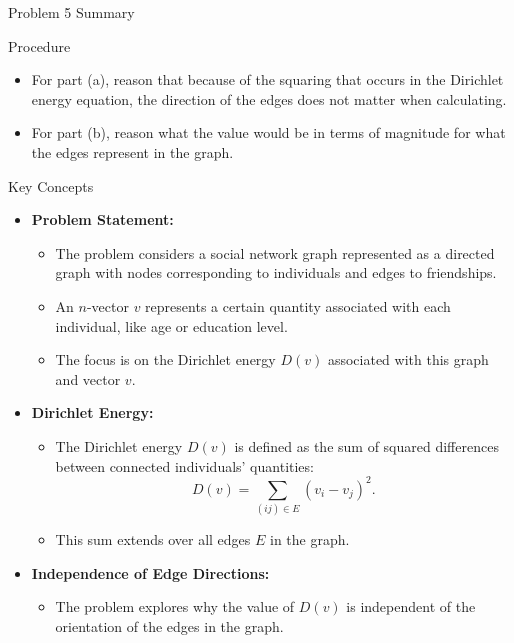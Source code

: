 \begin{summary}{Problem 5 Summary}
    \begin{statement}{Procedure}
        \begin{itemize}
            \item For part (a), reason that because of the squaring that occurs in the Dirichlet energy equation, the direction of the edges does not matter when calculating.
            \item For part (b), reason what the value would be in terms of magnitude for what the edges represent in the graph.
        \end{itemize}
    \end{statement}
    \begin{statement}{Key Concepts}
        \begin{itemize}
            \item \textbf{Problem Statement:}
            \begin{itemize}
                \item The problem considers a social network graph represented as a directed graph with nodes corresponding to individuals and edges to friendships.
                \item An $n$-vector $v$ represents a certain quantity associated with each individual, like age or education level.
                \item The focus is on the Dirichlet energy $D(v)$ associated with this graph and vector $v$.
            \end{itemize}
            \item \textbf{Dirichlet Energy:}
            \begin{itemize}
                \item The Dirichlet energy $D(v)$ is defined as the sum of squared differences between connected individuals' quantities:
                \begin{equation*}
                    D(v) = \sum_{(ij) \in E} (v_i - v_j)^2.
                \end{equation*}
                \item This sum extends over all edges $E$ in the graph.
            \end{itemize}
            \item \textbf{Independence of Edge Directions:}
            \begin{itemize}
                \item The problem explores why the value of $D(v)$ is independent of the orientation of the edges in the graph.

\end{itemize}
\end{itemize}
\end{statement}
\end{summary}
